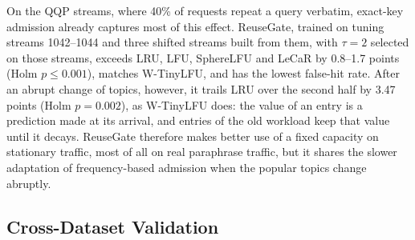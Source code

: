 \documentclass[authoryear,preprint,review,12pt]{elsarticle}
\begin{document}
On the QQP streams, where 40\% of requests repeat a query verbatim, exact-key admission already captures most of this effect. ReuseGate, trained on tuning streams 1042--1044 and three shifted streams built from them, with $\tau=2$ selected on those streams, exceeds LRU, LFU, SphereLFU and LeCaR by 0.8--1.7 points (Holm $p\le0.001$), matches W-TinyLFU, and has the lowest false-hit rate. After an abrupt change of topics, however, it trails LRU over the second half by 3.47 points (Holm $p=0.002$), as W-TinyLFU does: the value of an entry is a prediction made at its arrival, and entries of the old workload keep that value until it decays. ReuseGate therefore makes better use of a fixed capacity on stationary traffic, most of all on real paraphrase traffic, but it shares the slower adaptation of frequency-based admission when the popular topics change abruptly.

\subsection{Cross-Dataset Validation}
\label{subsec:cross_dataset_results}

\begin{table}[htbp]
\centering
\caption{Cross-encoder performance on the STS Benchmark test set ($n=1{,}379$).}
\label{tab:sts_cross_encoder_results}
\end{table}
\end{document}
